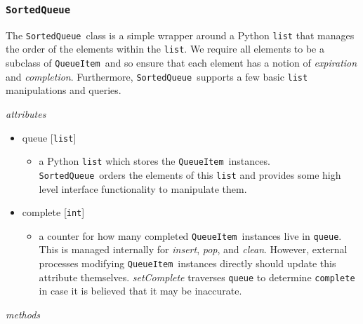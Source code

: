 \documentclass{article}
\newcommand{\SortedQueue}{\texttt{SortedQueue}~}
\newcommand{\QueueItem}{\texttt{QueueItem}~}
\begin{document}

\subsubsection{\SortedQueue}
\label{sec: SortedQueue}

The \SortedQueue class is a simple wrapper around a Python \texttt{list} that manages the order of the elements within the \texttt{list}.
We require all elements to be a subclass of \QueueItem and so ensure that each element has a notion of \textit{expiration} and \textit{completion}.
Furthermore, \SortedQueue supports a few basic \texttt{list} manipulations and queries.

\vspace{0.5cm}
\noindent
\textit{attributes}

\begin{itemize}
    \item{queue [\texttt{list}]
        \begin{itemize}
            \item{a Python \texttt{list} which stores the \QueueItem instances. \SortedQueue orders the elements of this \texttt{list} and provides some high level interface functionality to manipulate them.}
        \end{itemize}
         }
    \item{complete [\texttt{int}]
        \begin{itemize}
            \item{a counter for how many completed \QueueItem instances live in \texttt{queue}. This is managed internally for \textit{insert}, \textit{pop}, and \textit{clean}. However, external processes modifying \QueueItem instances directly should update this attribute themselves. \textit{setComplete} traverses \texttt{queue} to determine \texttt{complete} in case it is believed that it may be inaccurate.}
        \end{itemize}
         }
\end{itemize}

\noindent
\textit{methods}
\end{document}

